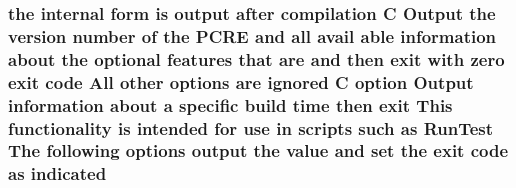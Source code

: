 \subsubsection[{\texorpdfstring{indicated}{indicated}}]{\setlength{\rightskip}{0pt plus 5cm}the internal form {\bf is} {\bf output} {\bf after} {\bf compilation} {\bf C} Output the version {\bf number} {\bf of} the {\bf P\+C\+RE} and {\bf all} avail {\bf able} information about the {\bf optional} {\bf features} that {\bf are} and then {\bf exit} {\bf with} {\bf zero} {\bf exit} {\bf code} All other {\bf options} {\bf are} {\bf ignored} {\bf C} {\bf option} Output information about {\bf a} specific build {\bf time} then {\bf exit} This functionality {\bf is} intended for use {\bf in} {\bf scripts} such {\bf as} Run\+Test The following {\bf options} {\bf output} the {\bf value} and {\bf set} the {\bf exit} {\bf code} {\bf as} indicated}\hypertarget{pcretest_8txt_a49ca0a14cf2b1c032893b28b50a0d81c}{}\label{pcretest_8txt_a49ca0a14cf2b1c032893b28b50a0d81c}
